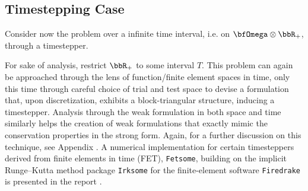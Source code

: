 \subsection*{Timestepping Case}
    
    Consider now the problem over a infinite time interval, i.e. on $\bfOmega\otimes\bbR_{+}$, through a timestepper.
    
     For sake of analysis, restrict $\bbR_{+}$ to some interval $T$. This problem can again be approached through the lens of function/finite element spaces in time, only this time through careful choice of trial and test space to devise a formulation that, upon discretization, exhibits a block-triangular structure, inducing a timestepper. Analysis through the weak formulation in both space and time similarly helps the creation of weak formulations that exactly mimic the conservation properties in the strong form. Again, for a further discussion on this technique, see Appendix . A numerical implementation for certain timesteppers derived from finite elements in time (FET), {\tt Fetsome}, building on the implicit Runge--Kutta method package {\tt Irksome} for the finite-element software {\tt Firedrake} is presented in the report \cite{La22}.